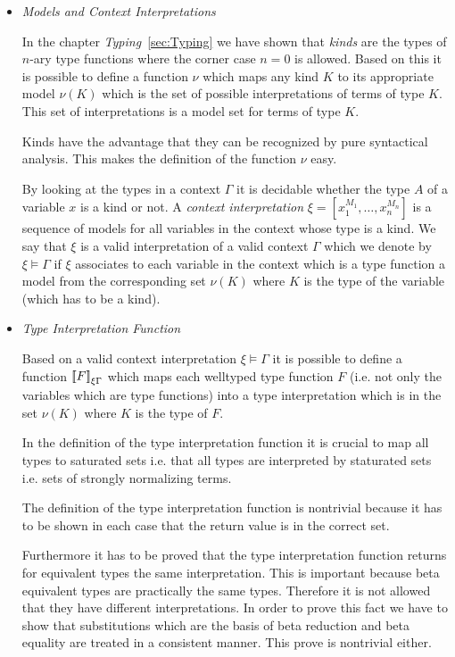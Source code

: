 \begin{itemize}
    \item \emph{Models and Context Interpretations}

        In the chapter \emph{Typing}~\ref{sec:Typing} we have shown that
        \emph{kinds} are the types of $n$-ary type functions where the corner
        case $n = 0$ is allowed. Based on this it is possible to define a
        function $\nu$ which maps any kind $K$ to its appropriate model $\nu(K)$
        which is the set of possible interpretations of terms of type $K$. This
        set of interpretations is a model set for terms of type $K$.

        Kinds have the advantage that they can be recognized by pure syntactical
        analysis. This makes the definition of the function $\nu$ easy.

        By looking at the types in a context $\Gamma$ it is decidable whether
        the type $A$ of a variable $x$ is a kind or not. A \emph{context
        interpretation} $\xi = [x_1^{M_1}, \ldots, x_n^{M_n}]$ is a sequence of
        models for all variables in the context whose type is a kind. We say
        that $\xi$ is a valid interpretation of a valid context $\Gamma$ which
        we denote by $\xi \vDash \Gamma$ if $\xi$ associates to each variable in
        the context which is a type function a model from the corresponding set
        $\nu(K)$ where $K$ is the type of the variable (which has to be a kind).

    \item \emph{Type Interpretation Function}

        Based on a valid context interpretation $\xi \vDash \Gamma$ it is
        possible to define a function ${{{[\![} F {]\!]}}_{\xi\Gamma}}$ which maps each
        welltyped type function $F$ (i.e. not only the variables which are type
        functions) into a type interpretation which is in the set $\nu(K)$ where
        $K$ is the type of $F$.

        In the definition of the type interpretation function it is crucial to
        map all types to saturated sets i.e. that all types are interpreted by
        staturated sets i.e. sets of strongly normalizing terms.

        The definition of the type interpretation function is nontrivial because
        it has to be shown in each case that the return value is in the correct
        set.

        Furthermore it has to be proved that the type interpretation function
        returns for equivalent types the same interpretation. This is important
        because beta equivalent types are practically the same types. Therefore
        it is not allowed that they have different interpretations. In order to
        prove this fact we have to show that substitutions which are the basis
        of beta reduction and beta equality are treated in a consistent manner.
        This prove is nontrivial either.



\end{itemize}
